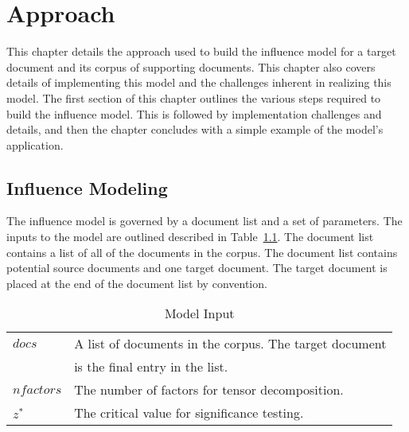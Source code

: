 \documentclass[../ut-dissertation.tex]{subfiles}
\begin{document}


\chapter{Approach}
This chapter details the approach used to build the influence model
for a target document and its corpus of supporting documents.  This
chapter also covers details of implementing this model and the
challenges inherent in realizing this model.  The first section of
this chapter outlines the various steps required to build the
influence model.  This is followed by implementation challenges and
details, and then the chapter concludes with a simple example of the
model's application.

\section{Influence Modeling}
The influence model is governed by a document list and a set of
parameters.  The inputs to the model are outlined described in
Table~\ref{table:modelInput}.  The document list contains a list of all
of the documents in the corpus.  The document list contains potential
source documents and one target document.  The target document is
placed at the end of the document list by convention.
\begin{table}
  \begin{tabular}{ll}
    \hline
    $docs$ & A list of documents in the corpus.  The target document\\
           & is the final entry in the list. \\
    $nfactors$ & The number of factors for tensor decomposition.\\
    $z^*$ & The critical value for significance testing.\\
    \hline
  \end{tabular}
  \caption{Model Input}
  \label{table:modelInput}
\end{table}
\end{document}
